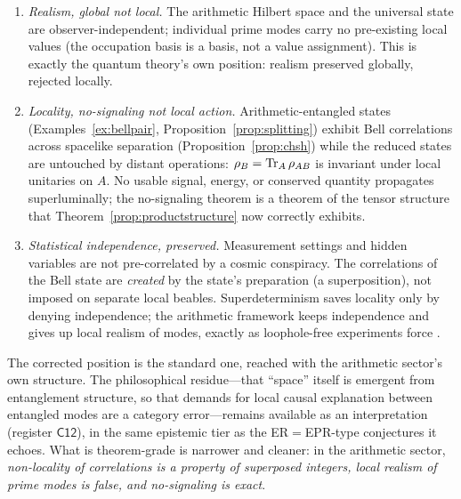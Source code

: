 \begin{enumerate}[leftmargin=1.6em]
\item \emph{Realism, global not local.} The arithmetic Hilbert space and the universal
state are observer-independent; individual prime modes carry no pre-existing local values
(the occupation basis is a basis, not a value assignment). This is exactly the
quantum theory's own position: realism preserved globally, rejected locally.
\item \emph{Locality, no-signaling not local action.} Arithmetic-entangled states
(Examples~\ref{ex:bellpair}, Proposition~\ref{prop:splitting}) exhibit Bell correlations
across spacelike separation (Proposition~\ref{prop:chsh}) while the reduced states are
untouched by distant operations: $\rho_{B}=\operatorname{Tr}_{A}\rho_{AB}$ is invariant under local
unitaries on $A$. No usable signal, energy, or conserved quantity propagates
superluminally; the no-signaling theorem is a theorem of the tensor structure that
Theorem~\ref{prop:productstructure} now correctly exhibits.
\item \emph{Statistical independence, preserved.} Measurement settings and hidden variables
are not pre-correlated by a cosmic conspiracy. The correlations of the Bell state are
\emph{created} by the state's preparation (a superposition), not imposed on separate
local beables. Superdeterminism saves locality only by denying independence; the arithmetic
framework keeps independence and gives up local realism of modes, exactly as
loophole-free experiments \cite{hensen2015} force \cite{bell1964,chsh1969}.
\end{enumerate}

The corrected position is the standard one, reached with the arithmetic sector's own
structure. The philosophical residue---that ``space'' itself is emergent from entanglement
structure, so that demands for local causal explanation between entangled modes are a
category error---remains available as an interpretation (register $\mathsf{C12}$), in the
same epistemic tier as the ER$=$EPR-type conjectures it echoes. What is theorem-grade is
narrower and cleaner: in the arithmetic sector, \emph{non-locality of correlations is a
property of superposed integers, local realism of prime modes is false, and no-signaling is
exact}.
